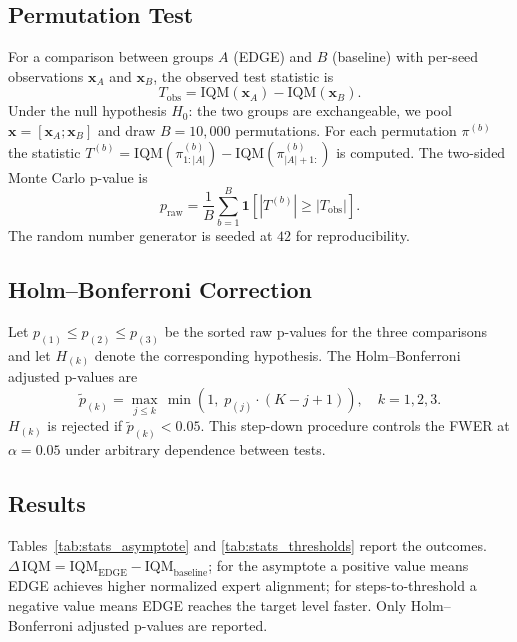 \subsection*{Permutation Test}

For a comparison between groups $A$ (EDGE) and $B$ (baseline) with per-seed
observations $\mathbf{x}_A$ and $\mathbf{x}_B$, the observed test statistic is
\begin{equation}
  T_{\mathrm{obs}} = \mathrm{IQM}(\mathbf{x}_A) - \mathrm{IQM}(\mathbf{x}_B).
\end{equation}
Under the null hypothesis $H_0$: the two groups are exchangeable, we pool
$\mathbf{x} = [\mathbf{x}_A; \mathbf{x}_B]$ and draw $B = 10{,}000$
permutations.
For each permutation $\pi^{(b)}$ the statistic
$T^{(b)} = \mathrm{IQM}(\pi^{(b)}_{1:|A|}) - \mathrm{IQM}(\pi^{(b)}_{|A|+1:})$
is computed.
The two-sided Monte Carlo p-value is
\begin{equation}
  p_{\mathrm{raw}} =
    \frac{1}{B}\sum_{b=1}^{B}
    \mathbf{1}\!\left[|T^{(b)}| \ge |T_{\mathrm{obs}}|\right].
\end{equation}
The random number generator is seeded at $42$ for reproducibility.

\subsection*{Holm–Bonferroni Correction}

Let $p_{(1)} \le p_{(2)} \le p_{(3)}$ be the sorted raw p-values for the three
comparisons and let $H_{(k)}$ denote the corresponding hypothesis.
The Holm–Bonferroni adjusted p-values are
\begin{equation}
  \tilde{p}_{(k)} = \max_{j \le k}\,\min\!\left(1,\; p_{(j)} \cdot (K - j + 1)\right),
  \quad k = 1, 2, 3.
\end{equation}
$H_{(k)}$ is rejected if $\tilde{p}_{(k)} < 0.05$.
This step-down procedure controls the FWER at $\alpha = 0.05$ under arbitrary
dependence between tests.

\subsection*{Results}

Tables~\ref{tab:stats_asymptote} and \ref{tab:stats_thresholds} report the
outcomes.
$\Delta\,\mathrm{IQM} = \mathrm{IQM}_{\mathrm{EDGE}} - \mathrm{IQM}_{\mathrm{baseline}}$;
for the asymptote a positive value means EDGE achieves higher normalized expert
alignment; for steps-to-threshold a negative value means EDGE reaches the target
level faster.
Only Holm–Bonferroni adjusted p-values are reported.

